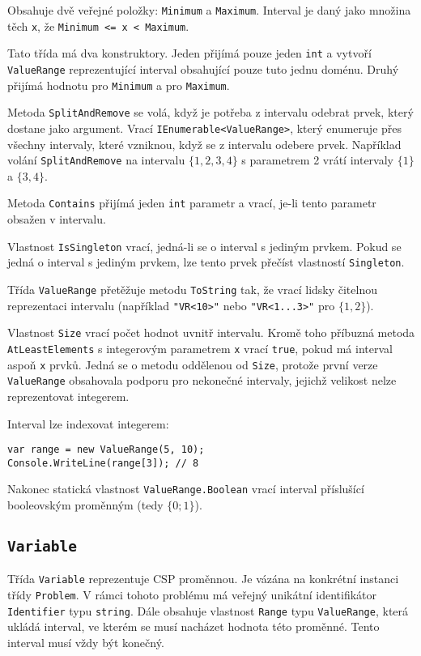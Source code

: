 \documentclass[a4paper]{article}
\begin{document}
Obsahuje dvě veřejné položky: \texttt{Minimum} a \texttt{Maximum}. Interval
je daný jako množina těch \texttt{x}, že \texttt{Minimum <= x < Maximum}.

Tato třída má dva konstruktory. Jeden přijímá pouze jeden \texttt{int} a vytvoří
\texttt{ValueRange} reprezentující interval obsahující pouze tuto jednu doménu.
Druhý přijímá hodnotu pro \texttt{Minimum} a pro \texttt{Maximum}.

Metoda \texttt{SplitAndRemove} se volá, když je potřeba z intervalu odebrat
prvek, který dostane jako argument. Vrací \texttt{IEnumerable<ValueRange>},
který enumeruje přes všechny
intervaly, které vzniknou, když se z intervalu odebere prvek. Například volání
\texttt{SplitAndRemove} na intervalu $\{1,2,3,4\}$ s parametrem 2 vrátí
intervaly $\{1\}$ a $\{3,4\}$.

Metoda \texttt{Contains} přijímá jeden \texttt{int} parametr a vrací, je-li
tento parametr obsažen v intervalu.

Vlastnost \texttt{IsSingleton} vrací, jedná-li se o interval s jediným prvkem.
Pokud se jedná o interval s jediným prvkem, lze tento prvek přečíst vlastností
\texttt{Singleton}.

Třída \texttt{ValueRange} přetěžuje metodu \texttt{ToString} tak, že vrací
lidsky čitelnou reprezentaci intervalu (například \texttt{"VR<10>"} nebo
\texttt{"VR<1...3>"} pro $\{1,2\}$).

Vlastnost \texttt{Size} vrací počet hodnot uvnitř intervalu.
Kromě toho příbuzná metoda \texttt{AtLeastElements} s integerovým parametrem \texttt{x} vrací
\texttt{true}, pokud má interval aspoň \texttt{x} prvků. Jedná se o metodu
oddělenou od \texttt{Size}, protože první verze \texttt{ValueRange} obsahovala
podporu pro nekonečné intervaly, jejichž velikost nelze reprezentovat integerem.

Interval lze indexovat integerem:
\begin{lstlisting}
var range = new ValueRange(5, 10);
Console.WriteLine(range[3]); // 8
\end{lstlisting}

Nakonec statická vlastnost \texttt{ValueRange.Boolean} vrací interval příslušící
booleovským proměnným (tedy $\{0;1\}$).

\subsection{\texttt{Variable}}
Třída \texttt{Variable} reprezentuje CSP proměnnou. Je vázána na konkrétní
instanci třídy \texttt{Problem}. V rámci tohoto problému má veřejný unikátní
identifikátor \texttt{Identifier} typu \texttt{string}. Dále obsahuje vlastnost
\texttt{Range} typu \texttt{ValueRange}, která ukládá interval, ve kterém se
musí nacházet hodnota této proměnné. Tento interval musí vždy být konečný.
\end{document}
